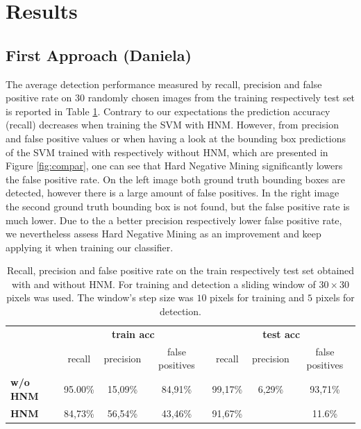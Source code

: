 \documentclass[12pt,a4paper,bibliography=totocnumbered,listof=totocnumbered]{scrartcl}
\begin{document}
\pagebreak
\section{Results}
\subsection{First Approach \small{(Daniela)}}

The average detection performance measured by recall, precision and false positive rate on 30 randomly chosen images from the training respectively test set is reported in Table \ref{tab:perf}. Contrary to our expectations the prediction accuracy (recall) decreases when training the SVM with HNM. However, from precision and false positive values or when having a look at the bounding box predictions of the SVM trained with respectively without HNM, which are presented in Figure \ref{fig:compar}, one can see that Hard Negative Mining significantly lowers the false positive rate. On the left image both ground truth bounding boxes are detected, however there is a large amount of false positives. In the right image the second ground truth bounding box is not found, but the false positive rate is much lower. Due to the a better precision respectively lower false positive rate, we nevertheless assess Hard Negative Mining as an improvement and keep applying it when training our classifier.

\begin{table}[H]
\centering
\caption{Recall, precision and false positive rate on the train respectively test set obtained with and without HNM. For training and detection a sliding window of $30 \times 30$ pixels was used. The window's step size was $10$ pixels for training and $5$ pixels for detection.}
\small
  \begin{tabular}{l | c c c c c c}
  	  & 
      \multicolumn{3}{c}{\textbf{train acc}} &
      \multicolumn{3}{c}{\textbf{test acc}} \\
    & recall & precision & false positives & recall & precision & false positives \\ \toprule
    \textbf{w/o HNM} & 95.00\% & 15,09\% & 84,91\% & 99,17\% &6,29\% & 93,71\% \\
    \textbf{HNM}  & 84,73\% & 56,54\% & 43,46\% & 91,67\% & & 11.6\% \\
  \end{tabular}
  \label{tab:perf}
\end{table}
\end{document}
